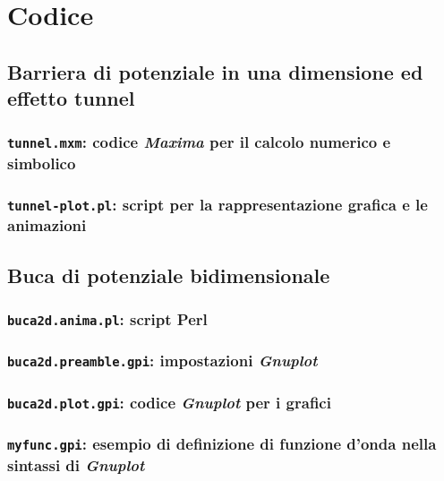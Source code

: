 
\chapter{Codice}\label{ch:code}

\section{Barriera di potenziale in una dimensione ed effetto tunnel}%

\subsection{\texttt{tunnel.mxm}: codice \emph{Maxima} per il calcolo
numerico e simbolico}\label{sec:tunnel.mxm}%


\subsection{\texttt{tunnel-plot.pl}: script per la rappresentazione
grafica e le animazioni}\label{sec:tunnel-plot.pl}%



\section{Buca di potenziale bidimensionale}

\subsection{\texttt{buca2d.anima.pl}: script Perl}\label{sec:buca2d.anima.pl}%


\subsection{\texttt{buca2d.preamble.gpi}: impostazioni \emph{Gnuplot}}%
\label{sec:buca2d.preamble.gpi}%


\subsection{\texttt{buca2d.plot.gpi}: codice \emph{Gnuplot} 
per i grafici}\label{sec:buca2d.plot.gpi}%


\subsection{\texttt{myfunc.gpi}: esempio di definizione
di funzione d'onda nella sintassi di \emph{Gnuplot}}%
\label{sec:myfunc.gpi}%


